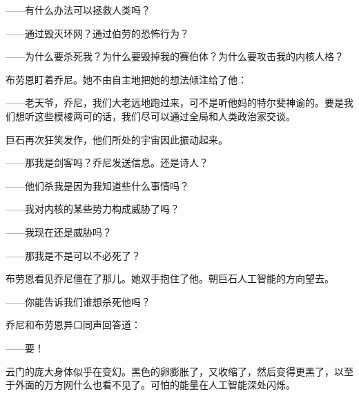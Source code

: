 \documentclass[AutoFakeBold=true]{book}
\begin{document}
{\heiti [对]}

{\kaishu ——有什么办法可以拯救人类吗？}

{}

{\kaishu ——通过毁灭环网？通过伯劳的恐怖行为？}

{\heiti [对]}

{\kaishu ——为什么要杀死我？为什么要毁掉我的赛伯体？为什么要攻击我的内核人格？}

{}

布劳恩盯着乔尼。她不由自主地把她的想法倾注给了他：

{\kaishu ——老天爷，乔尼，我们大老远地跑过来，可不是听他妈的特尔斐神谕的。要是我们想听这些模棱两可的话，我们尽可以通过全局和人类政治家交谈。}

{\heiti [嚇！]}

巨石再次狂笑发作，他们所处的宇宙因此振动起来。

{\kaishu ——那我是剑客吗？}乔尼发送信息。{\kaishu 还是诗人？}

{}

{\kaishu ——他们杀我是因为我知道些什么事情吗？}

{}

{\kaishu ——我对内核的某些势力构成威胁了吗？}

{\heiti [对]}

{\kaishu ——我现在还是威胁吗？}

{\heiti [不]}

{\kaishu ——那我是不是可以不必死了？}

{}

布劳恩看见乔尼僵在了那儿。她双手抱住了他。朝巨石人工智能的方向望去。

{\kaishu ——你能告诉我们谁想杀死他吗？}

{}

乔尼和布劳恩异口同声回答道：

{\kaishu ——要！}

云门的庞大身体似乎在变幻。黑色的卵膨胀了，又收缩了，然后变得更黑了，以至于外面的万方网什么也看不见了。可怕的能量在人工智能深处闪烁。
\end{document}
